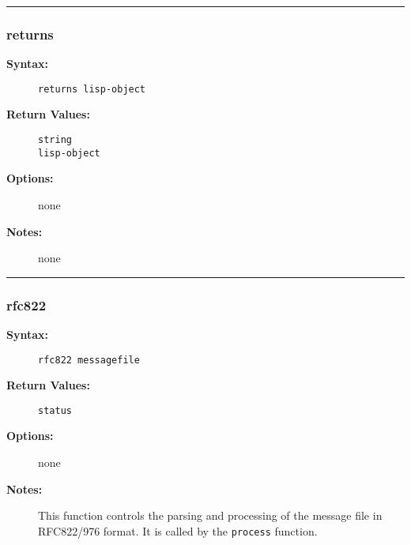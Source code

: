 \hrule
\subsubsection{returns}

\begin{description}
\item[{\bf Syntax:}] \mbox{}

{\tt returns lisp-object}

\item[{\bf Return Values:}] \mbox{}

\begin{description}
\item[{\tt string}] \mbox{}



\item[{\tt lisp-object}] \mbox{}



\end{description}


\item[{\bf Options:}] \mbox{}

none  

\item[{\bf Notes:}] \mbox{}

none

\end{description}


\hrule
\subsubsection{rfc822}

\begin{description}
\item[{\bf Syntax:}] \mbox{}

{\tt rfc822 messagefile}

\item[{\bf Return Values:}] \mbox{}

{\tt status}

\item[{\bf Options:}] \mbox{}

none

\item[{\bf Notes:}] \mbox{}

This function controls the parsing and 
processing of the message file in RFC822/976 format. It is 
called by the {\tt process} function. 

\end{description}


